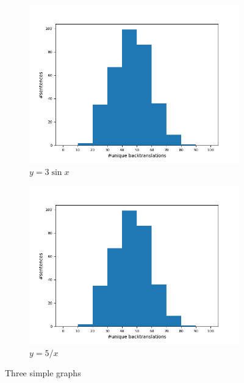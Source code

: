 \begin{figure}
\begin{subfigure}{0.49\textwidth}
         \label{fig:five over x}
     \end{subfigure}
     \begin{subfigure}{0.49\textwidth}
         \centering
         \includegraphics[width=\textwidth]{figures/unique_back_original.png}
         \caption{$y=3\sin x$}
         \label{fig:three sin x}
     \end{subfigure}
     \hfill
     \begin{subfigure}{0.49\textwidth}
         \centering
         \includegraphics[width=\textwidth]{figures/unique_back_original.png}
         \caption{$y=5/x$}
         \label{fig:five over x}
     \end{subfigure}
        \caption{Three simple graphs}
        \label{fig:three graphs}

\end{figure}